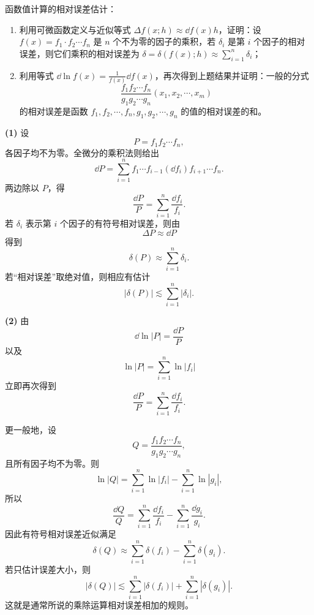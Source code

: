 \begin{xreferenceproblem}[8]
函数值计算的相对误差估计：
  \begin{enumerate}[label=(\arabic*)]
    \item 利用可微函数定义与近似等式 $\Delta f(x;h)\approx\dd f(x)h$，证明：设 $f(x)=f_1\cdot f_2\cdots f_n$ 是 $n$ 个不为零的因子的乘积，若 $\delta_i$ 是第 $i$ 个因子的相对误差，则它们乘积的相对误差为 $\delta=\delta(f(x);h)\approx\sum_{i=1}^n\delta_i$；
    \item 利用等式 $\dd\ln f(x)=\frac1{f(x)}\dd f(x)$，再次得到上题结果并证明：一般的分式
    \[
      \frac{f_1f_2\cdots f_n}{g_1g_2\cdots g_n}(x_1,x_2,\cdots,x_m)
    \]
    的相对误差是函数 $f_1,f_2,\cdots,f_n,g_1,g_2,\cdots,g_n$ 的值的相对误差的和。
  \end{enumerate}
\end{xreferenceproblem}
\begin{xsolution}
\textbf{(1)} 设
\[
  P=f_1f_2\cdots f_n,
\]
各因子均不为零。全微分的乘积法则给出
\[
  \dd P
  =\sum_{i=1}^n
    f_1\cdots f_{i-1}(\dd f_i)f_{i+1}\cdots f_n.
\]
两边除以 $P$，得
\[
  \frac{\dd P}{P}
  =\sum_{i=1}^n\frac{\dd f_i}{f_i}.
\]
若 $\delta_i$ 表示第 $i$ 个因子的有符号相对误差，则由
\[
  \Delta P\approx\dd P
\]
得到
\[
  \boxed{
  \delta(P)\approx\sum_{i=1}^n\delta_i}.
\]
若“相对误差”取绝对值，则相应有估计
\[
  |\delta(P)|\lesssim\sum_{i=1}^n|\delta_i|.
\]

\textbf{(2)} 由
\[
  \dd\ln|P|=\frac{\dd P}{P}
\]
以及
\[
  \ln|P|=\sum_{i=1}^n\ln|f_i|
\]
立即再次得到
\[
  \frac{\dd P}{P}=\sum_{i=1}^n\frac{\dd f_i}{f_i}.
\]

更一般地，设
\[
  Q=\frac{f_1f_2\cdots f_n}{g_1g_2\cdots g_n},
\]
且所有因子均不为零。则
\[
  \ln|Q|
  =\sum_{i=1}^n\ln|f_i|-
    \sum_{i=1}^n\ln|g_i|,
\]
所以
\[
  \frac{\dd Q}{Q}
  =\sum_{i=1}^n\frac{\dd f_i}{f_i}
   -\sum_{i=1}^n\frac{\dd g_i}{g_i}.
\]
因此有符号相对误差近似满足
\[
  \boxed{
  \delta(Q)
  \approx\sum_{i=1}^n\delta(f_i)
  -\sum_{i=1}^n\delta(g_i)}.
\]
若只估计误差大小，则
\[
  \boxed{
  |\delta(Q)|
  \lesssim\sum_{i=1}^n|\delta(f_i)|
  +\sum_{i=1}^n|\delta(g_i)|}.
\]
这就是通常所说的乘除运算相对误差相加的规则。
\end{xsolution}


